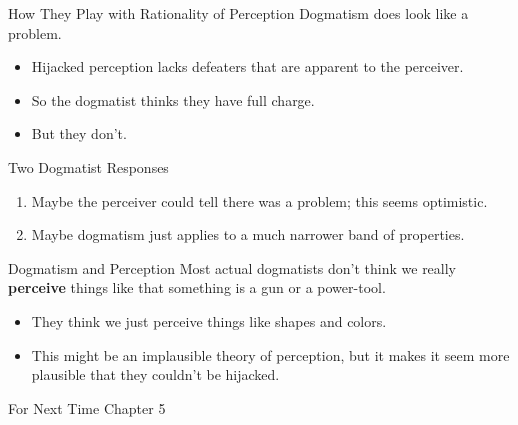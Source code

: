 \documentclass[
  17pt,
  letterpaper,
  ignorenonframetext,
  aspectratio=169,
  handout,
  xcolor={dvipsnames}]{beamer}
\providecommand{\tightlist}{%
  \setlength{\itemsep}{0pt}\setlength{\parskip}{0pt}}\usepackage{longtable,booktabs,array}
\begin{document}
\begin{frame}{How They Play with Rationality of Perception}
\protect\hypertarget{how-they-play-with-rationality-of-perception-3}{}
Dogmatism does look like a problem.

\begin{itemize}[<+->]
\tightlist
\item
  Hijacked perception lacks defeaters that are apparent to the
  perceiver.
\item
  So the dogmatist thinks they have full charge.
\item
  But they don't.
\end{itemize}
\end{frame}

\begin{frame}{Two Dogmatist Responses}
\protect\hypertarget{two-dogmatist-responses}{}
\begin{enumerate}[<+->]
\tightlist
\item
  Maybe the perceiver could tell there was a problem; this seems
  optimistic.
\item
  Maybe dogmatism just applies to a much narrower band of properties.
\end{enumerate}
\end{frame}

\begin{frame}{Dogmatism and Perception}
\protect\hypertarget{dogmatism-and-perception}{}
Most actual dogmatists don't think we really \textbf{perceive} things
like that something is a gun or a power-tool.

\begin{itemize}[<+->]
\tightlist
\item
  They think we just perceive things like shapes and colors.
\item
  This might be an implausible theory of perception, but it makes it
  seem more plausible that they couldn't be hijacked.
\end{itemize}
\end{frame}

\begin{frame}{For Next Time}
\protect\hypertarget{for-next-time}{}
Chapter 5
\end{frame}
\end{document}

